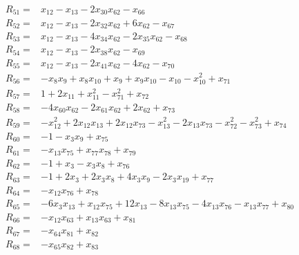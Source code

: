 \documentclass[11pt]{article}
\theoremstyle{remark}\newtheorem{remark}[theorem]{Remark}
\begin{document}
\begin{align*}
R_{51} ={}& x_{12} - x_{13} - 2x_{30}x_{62} - x_{66} \\[4pt]
R_{52} ={}& x_{12} - x_{13} - 2x_{32}x_{62} + 6x_{62} - x_{67} \\[4pt]
R_{53} ={}& x_{12} - x_{13} - 4x_{34}x_{62} - 2x_{35}x_{62} - x_{68} \\[4pt]
R_{54} ={}& x_{12} - x_{13} - 2x_{38}x_{62} - x_{69} \\[4pt]
R_{55} ={}& x_{12} - x_{13} - 2x_{41}x_{62} - 4x_{62} - x_{70} \\[4pt]
R_{56} ={}& -x_{8}x_{9} + x_{8}x_{10} + x_{9} + x_{9}x_{10} - x_{10} - x_{10}^{2} + x_{71} \\[4pt]
R_{57} ={}& 1 + 2x_{11} + x_{11}^{2} - x_{71}^{2} + x_{72} \\[4pt]
R_{58} ={}& -4x_{60}x_{62} - 2x_{61}x_{62} + 2x_{62} + x_{73} \\[4pt]
R_{59} ={}& -x_{12}^{2} + 2x_{12}x_{13} + 2x_{12}x_{73} - x_{13}^{2} - 2x_{13}x_{73} - x_{72}^{2} - x_{73}^{2} + x_{74} \\[4pt]
R_{60} ={}& -1 - x_{3}x_{9} + x_{75} \\[4pt]
R_{61} ={}& -x_{13}x_{75} + x_{77}x_{78} + x_{79} \\[4pt]
R_{62} ={}& -1 + x_{3} - x_{3}x_{8} + x_{76} \\[4pt]
R_{63} ={}& -1 + 2x_{3} + 2x_{3}x_{8} + 4x_{3}x_{9} - 2x_{3}x_{19} + x_{77} \\[4pt]
R_{64} ={}& -x_{12}x_{76} + x_{78} \\[4pt]
R_{65} ={}& -6x_{3}x_{13} + x_{12}x_{75} + 12x_{13} - 8x_{13}x_{75} - 4x_{13}x_{76} - x_{13}x_{77} + x_{80} \\[4pt]
R_{66} ={}& -x_{12}x_{63} + x_{13}x_{63} + x_{81} \\[4pt]
R_{67} ={}& -x_{64}x_{81} + x_{82} \\[4pt]
R_{68} ={}& -x_{65}x_{82} + x_{83} \\[4pt]

\end{align*}
\end{document}
